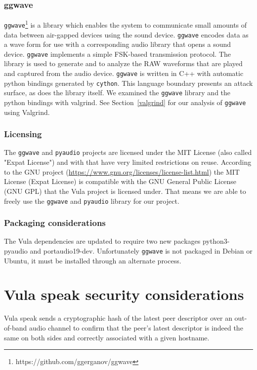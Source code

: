 \documentclass[a4paper,11pt]{report}
\begin{document}
\subsection{ggwave}
\texttt{ggwave}\footnote[1]{https://github.com/ggerganov/ggwave} is a library which enables the system to communicate small amounts of data between air-gapped devices using the sound device. \texttt{ggwave} encodes data as a wave form for use with a corresponding audio library that opens a sound device. \texttt{ggwave} implements a simple FSK-based transmission protocol. The library is used to generate and to analyze the RAW waveforms that are played and captured from the audio device.\newline
\texttt{ggwave} is written in C++ with automatic python bindings generated by \texttt{cython}. This language boundary presents an attack surface, as does the library itself. We examined the \texttt{ggwave} library and the python bindings with valgrind. See Section~\ref{valgrind} for our analysis of \texttt{ggwave} using Valgrind.

\subsection{Licensing}
The \texttt{ggwave} and \texttt{pyaudio} projects are licensed under the MIT License (also called "Expat License") and with that have very limited restrictions on reuse.
According to the GNU project (\url{https://www.gnu.org/licenses/license-list.html}) the MIT License (Expat License) is compatible with the GNU General Public License (GNU GPL) that the Vula project is licensed under. \newline
That means we are able to freely use the \texttt{ggwave} and \texttt{pyaudio} library for our project.

\subsection{Packaging considerations}
The Vula dependencies are updated to require two new packages python3-pyaudio and portaudio19-dev. Unfortunately \texttt{ggwave} is not packaged in Debian or Ubuntu, it must be installed through an alternate process.



\chapter{Vula speak security considerations}
Vula speak sends a cryptographic hash of the latest peer descriptor over an out-of-band audio channel to confirm that the peer's latest descriptor is indeed the same on both sides and correctly associated with a given hostname.
\end{document}
